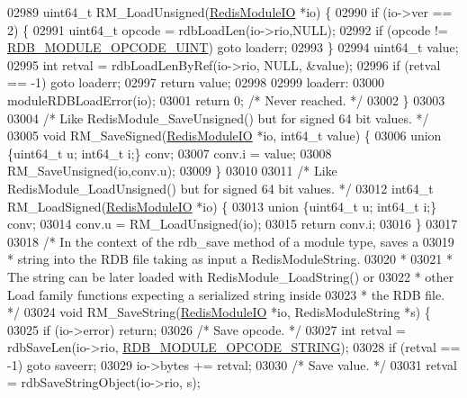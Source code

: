 \begin{DoxyCode}
{{{{{02989 uint64\_t RM\_LoadUnsigned(\hyperlink{structRedisModuleIO}{RedisModuleIO} *io) \{
02990     \textcolor{keywordflow}{if} (io->ver == 2) \{
02991         uint64\_t opcode = rdbLoadLen(io->rio,NULL);
02992         \textcolor{keywordflow}{if} (opcode != \hyperlink{rdb_8h_a51400e437b171bb1d6206058b48e9938}{RDB\_MODULE\_OPCODE\_UINT}) \textcolor{keywordflow}{goto} loaderr;
02993     \}
02994     uint64\_t value;
02995     \textcolor{keywordtype}{int} retval = rdbLoadLenByRef(io->rio, NULL, &value);
02996     \textcolor{keywordflow}{if} (retval == -1) \textcolor{keywordflow}{goto} loaderr;
02997     \textcolor{keywordflow}{return} value;
02998 
02999 loaderr:
03000     moduleRDBLoadError(io);
03001     \textcolor{keywordflow}{return} 0; \textcolor{comment}{/* Never reached. */}
03002 \}
03003 
03004 \textcolor{comment}{/* Like RedisModule\_SaveUnsigned() but for signed 64 bit values. */}
03005 \textcolor{keywordtype}{void} RM\_SaveSigned(\hyperlink{structRedisModuleIO}{RedisModuleIO} *io, int64\_t value) \{
03006     \textcolor{keyword}{union} \{uint64\_t u; int64\_t i;\} conv;
03007     conv.i = value;
03008     RM\_SaveUnsigned(io,conv.u);
03009 \}
03010 
03011 \textcolor{comment}{/* Like RedisModule\_LoadUnsigned() but for signed 64 bit values. */}
03012 int64\_t RM\_LoadSigned(\hyperlink{structRedisModuleIO}{RedisModuleIO} *io) \{
03013     \textcolor{keyword}{union} \{uint64\_t u; int64\_t i;\} conv;
03014     conv.u = RM\_LoadUnsigned(io);
03015     \textcolor{keywordflow}{return} conv.i;
03016 \}
03017 
03018 \textcolor{comment}{/* In the context of the rdb\_save method of a module type, saves a}
03019 \textcolor{comment}{ * string into the RDB file taking as input a RedisModuleString.}
03020 \textcolor{comment}{ *}
03021 \textcolor{comment}{ * The string can be later loaded with RedisModule\_LoadString() or}
03022 \textcolor{comment}{ * other Load family functions expecting a serialized string inside}
03023 \textcolor{comment}{ * the RDB file. */}
03024 \textcolor{keywordtype}{void} RM\_SaveString(\hyperlink{structRedisModuleIO}{RedisModuleIO} *io, RedisModuleString *s) \{
03025     \textcolor{keywordflow}{if} (io->error) \textcolor{keywordflow}{return};
03026     \textcolor{comment}{/* Save opcode. */}
03027     \textcolor{keywordtype}{int} retval = rdbSaveLen(io->rio, \hyperlink{rdb_8h_aba61dd3092856fb28a71a7e0032d82f1}{RDB\_MODULE\_OPCODE\_STRING});
03028     \textcolor{keywordflow}{if} (retval == -1) \textcolor{keywordflow}{goto} saveerr;
03029     io->bytes += retval;
03030     \textcolor{comment}{/* Save value. */}
03031     retval = rdbSaveStringObject(io->rio, s);
}}}}}
\end{DoxyCode}
